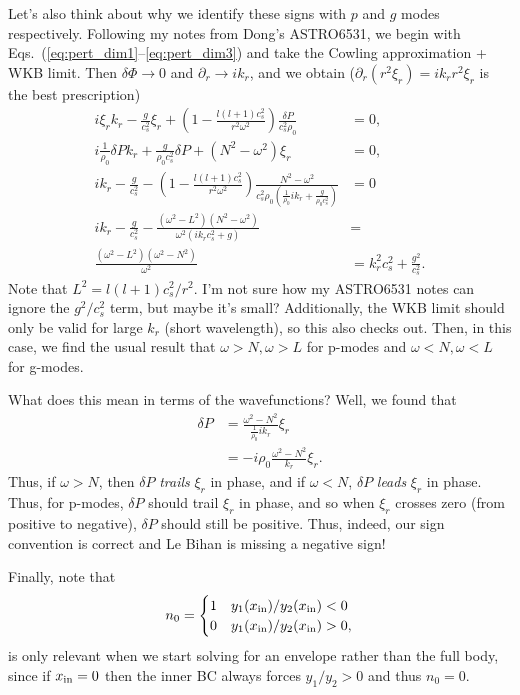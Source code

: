 \documentclass[11pt,
        usenames, %
        twocolumn,
        landscape,
        dvipsnames %
    ]{article}
\newcommand*{\p}[1]{\left(#1\right)}
\begin{document}
Let's also think about why we identify these signs with $p$ and $g$ modes
respectively. Following my notes from Dong's ASTRO6531, we begin with
Eqs.~(\ref{eq:pert_dim1}--\ref{eq:pert_dim3}) and take the Cowling approximation
+ WKB limit. Then $\delta \Phi \to 0$ and $\partial_r \to ik_r$, and we obtain
($\partial_r (r^2\xi_r) = ik_rr^2\xi_r$ is the best prescription)
\begin{align}
    i\xi_rk_r - \frac{g}{c_s^2}\xi_r
        + \p{1 - \frac{l(l+1)c_s^2}{r^2\omega^2}}
            \frac{\delta P}{c_s^2\rho_0} &= 0,\\
    i\frac{1}{\rho_0}\delta P k_r + \frac{g}{\rho_0c_s^2}\delta P
        + \p{N^2 - \omega^2}\xi_r &= 0,\label{eq:eom_cowling}\\
    ik_r - \frac{g}{c_s^2}
        - \p{1 - \frac{l(l+1)c_s^2}{r^2\omega^2}}
            \frac{N^2 - \omega^2}{c_s^2\rho_0
                \p{\frac{1}{\rho_0}ik_r + \frac{g}{\rho_0c_s^2}}}
            &= 0\nonumber\\
    ik_r - \frac{g}{c_s^2}
        - \frac{\p{\omega^2 - L^2}\p{N^2 - \omega^2}}{\omega^2
            (ik_rc_s^2 + g)}
            &=\nonumber\\
    \frac{\p{\omega^2 - L^2}\p{\omega^2 - N^2}}{\omega^2}
        &= k_r^2c_s^2 + \frac{g^2}{c_s^2}.
\end{align}
Note that $L^2 = l(l+1)c_s^2/r^2$. I'm not sure how my ASTRO6531 notes can
ignore the $g^2/c_s^2$ term, but maybe it's small? Additionally, the WKB limit
should only be valid for large $k_r$ (short wavelength), so this also checks
out. Then, in this case, we find the usual result that $\omega > N, \omega > L$
for p-modes and $\omega < N, \omega < L$ for g-modes.

What does this mean in terms of the wavefunctions? Well, we found that
\begin{align}
    \delta P &= \frac{\omega^2 - N^2}{\frac{1}{\rho_0}ik_r}\xi_r\nonumber\\
        &= -i\rho_0\frac{\omega^2 - N^2}{k_r}\xi_r.
\end{align}
Thus, if $\omega > N$, then $\delta P$ \emph{trails} $\xi_r$ in phase, and if
$\omega < N$, $\delta P$ \emph{leads} $\xi_r$ in phase. Thus, for p-modes,
$\delta P$ should trail $\xi_r$ in phase, and so when $\xi_r$ crosses zero (from
positive to negative), $\delta P$ should still be positive. Thus, indeed, our
sign convention is correct and Le Bihan is missing a negative sign!

Finally, note that
\begin{equation}
    n_0 =
    \begin{cases}
        1 & y_1(x_{\rm in}) / y_2(x_{\rm in}) < 0\\
        0 & y_1(x_{\rm in}) / y_2(x_{\rm in}) > 0,
    \end{cases}
\end{equation}
is only relevant when we start solving for an envelope rather than the full
body, since if $x_{\rm in} = 0$ then the inner BC always forces $y_1 / y_2 > 0$
and thus $n_0 = 0$.
\end{document}
